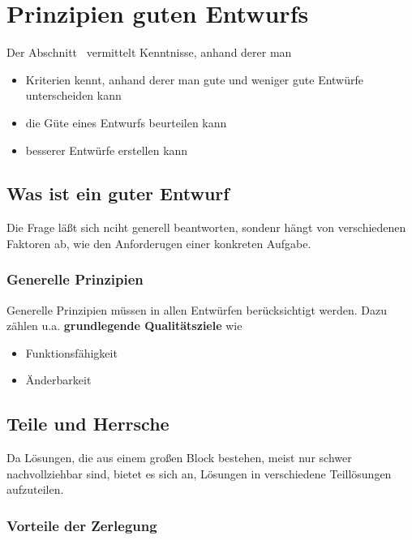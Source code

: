 \usepackage{lstmisc}\section{Prinzipien guten Entwurfs}

Der Abschnitt~\cite[69, 3.7 Prinzipien guten Entwurfs]{Wed09b} vermittelt Kenntnisse, anhand derer man

\begin{itemize}
    \item Kriterien kennt, anhand derer man gute und weniger gute Entwürfe unterscheiden kann
    \item die Güte eines Entwurfs beurteilen kann
    \item besserer Entwürfe erstellen kann
\end{itemize}

\subsection{Was ist ein guter Entwurf}

Die Frage läßt sich nciht generell beantworten, sondenr hängt von verschiedenen Faktoren ab, wie den Anforderugen einer konkreten Aufgabe.\\

\subsubsection*{Generelle Prinzipien}

Generelle Prinzipien müssen in allen Entwürfen berücksichtigt werden.
Dazu zählen u.a. \textbf{grundlegende Qualitätsziele} wie

\begin{itemize}
    \item Funktionsfähigkeit
    \item Änderbarkeit
\end{itemize}

\subsection{Teile und Herrsche}
Da Lösungen, die aus einem großen Block bestehen, meist nur schwer nachvollziehbar sind, bietet es sich an, Lösungen in verschiedene Teillösungen aufzuteilen.

\subsubsection*{Vorteile der Zerlegung}

